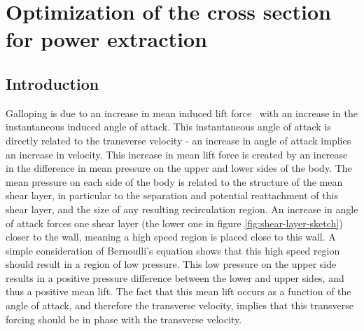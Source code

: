 \chapter{Optimization of the cross section for power extraction}

\section{Introduction}



 Galloping is due to an increase in mean induced lift force \cy\  with an increase in the instantaneous induced angle of attack. This instantaneous angle of attack is directly related to the transverse velocity - an increase in angle of attack implies an increase in velocity. This increase in mean lift force is created by an increase in the difference in mean pressure on the upper and lower sides of the body. The mean pressure on each side of the body is related to the structure of the mean shear layer, in particular to the separation and potential reattachment of this shear layer, and the size of any resulting recirculation region. An increase in angle of attack forces one shear layer (the lower one in figure \ref{fig:shear-layer-sketch}) closer to the wall, meaning a high speed region is placed close to this wall. A simple consideration of Bernoulli's equation shows that this high speed region should result in a region of low pressure. This low pressure on the upper side results in a positive pressure difference between the lower and upper sides, and thus a positive mean lift. The fact that this mean lift occurs as a function of the angle of attack, and therefore the transverse velocity, implies that this transverse forcing should be in phase with the transverse velocity.

